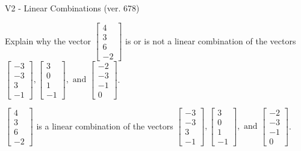 \begin{exercise}
  \begin{exerciseTitle}V2 - Linear Combinations (ver. 678)\end{exerciseTitle}
  \begin{exerciseStatement}
    Explain why the vector \(\left[\begin{array}{c}
4 \\
3 \\
6 \\
-2
\end{array}\right]\)  is or is not a linear 
	combination of the vectors \(\left[\begin{array}{c}
-3 \\
-3 \\
3 \\
-1
\end{array}\right] , \left[\begin{array}{c}
3 \\
0 \\
1 \\
-1
\end{array}\right] , \text{ and } \left[\begin{array}{c}
-2 \\
-3 \\
-1 \\
0
\end{array}\right]\).
	


  \end{exerciseStatement}
  \begin{exerciseAnswer}
   \(\left[\begin{array}{c}
4 \\
3 \\
6 \\
-2
\end{array}\right]\) 
  	 is  
	a linear combination of the vectors \(\left[\begin{array}{c}
-3 \\
-3 \\
3 \\
-1
\end{array}\right] , \left[\begin{array}{c}
3 \\
0 \\
1 \\
-1
\end{array}\right] , \text{ and } \left[\begin{array}{c}
-2 \\
-3 \\
-1 \\
0
\end{array}\right]\).

	
  


  \end{exerciseAnswer}
\end{exercise}